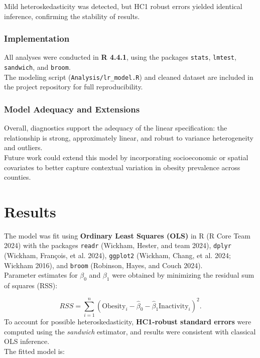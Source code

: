 \documentclass[
  letterpaper,
  DIV=11,
  numbers=noendperiod]{scrartcl}
\begin{document}
Mild heteroskedasticity was detected, but HC1 robust errors yielded
identical inference, confirming the stability of results.

\subsubsection{Implementation}\label{implementation}

All analyses were conducted in \textbf{R 4.4.1}, using the packages
\texttt{stats}, \texttt{lmtest}, \texttt{sandwich}, and
\texttt{broom}.\\
The modeling script (\texttt{Analysis/lr\_model.R}) and cleaned dataset
are included in the project repository for full reproducibility.

\subsubsection{Model Adequacy and
Extensions}\label{model-adequacy-and-extensions}

Overall, diagnostics support the adequacy of the linear specification:
the relationship is strong, approximately linear, and robust to variance
heterogeneity and outliers.\\
Future work could extend this model by incorporating socioeconomic or
spatial covariates to better capture contextual variation in obesity
prevalence across counties.

\section{Results}\label{results}

The model was fit using \textbf{Ordinary Least Squares (OLS)} in R (R
Core Team 2024) with the packages \texttt{readr} (Wickham, Hester, and
team 2024), \texttt{dplyr} (Wickham, François, et al. 2024),
\texttt{ggplot2} (Wickham, Chang, et al. 2024; Wickham 2016), and
\texttt{broom} (Robinson, Hayes, and Couch 2024).\\
Parameter estimates for \(\beta_0\) and \(\beta_1\) were obtained by
minimizing the residual sum of squares (RSS):

\[
RSS = \sum_{i=1}^{n}(\text{Obesity}_i - \hat{\beta}_0 - \hat{\beta}_1\text{Inactivity}_i)^2.
\] To account for possible heteroskedasticity, \textbf{HC1-robust
standard errors} were computed using the \emph{sandwich} estimator, and
results were consistent with classical OLS inference.\\
The fitted model is:
\end{document}
